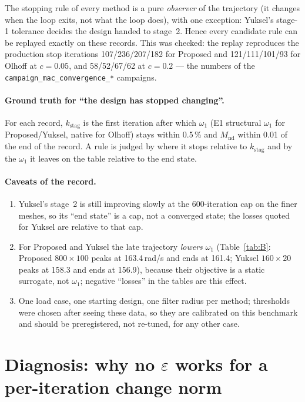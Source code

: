 \documentclass[11pt,a4paper]{article}
\newcommand{\Mnd}{M_{\mathrm{nd}}}
\newcommand{\kstag}{k_{\mathrm{stag}}}
\newcommand{\me}[2]{$#1\times#2$}
\newcommand{\file}[1]{\texttt{#1}}
\begin{document}
The stopping rule of every method is a pure \emph{observer} of the trajectory
(it changes when the loop exits, not what the loop does), with one exception:
Yuksel's stage-1 tolerance decides the design handed to stage~2. Hence every
candidate rule can be replayed exactly on these records. This was checked: the
replay reproduces the production stop iterations 107/236/207/182 for Proposed
and 121/111/101/93 for Olhoff at $c = 0.05$, and 58/52/67/62 at $c = 0.2$ --- the
numbers of the \file{campaign\_\allowbreak{}mac\_\allowbreak{}convergence\_\allowbreak{}*} campaigns.

\paragraph{Ground truth for ``the design has stopped changing''.}
For each record, $\kstag$ is the first iteration after which $\omega_1$ (E1
structural $\omega_1$ for Proposed/Yuksel, native for Olhoff) stays within
0.5\,\% and $\Mnd$ within 0.01 of the end of the record. A rule is judged by
where it stops relative to $\kstag$ and by the $\omega_1$ it leaves on the table
relative to the end state.

\paragraph{Caveats of the record.}
\begin{enumerate}[label=(\roman*)]
\item Yuksel's stage~2 is still improving slowly at the 600-iteration cap on
  the finer meshes, so its ``end state'' is a cap, not a converged state; the
  losses quoted for Yuksel are relative to that cap.
\item For Proposed and Yuksel the late trajectory \emph{lowers} $\omega_1$
  (Table~\ref{tab:B}: Proposed \me{800}{100} peaks at 163.4\,rad/s and ends at
  161.4; Yuksel \me{160}{20} peaks at 158.3 and ends at 156.9), because their
  objective is a static surrogate, not $\omega_1$; negative ``losses'' in the
  tables are this effect.
\item One load case, one starting design, one filter radius per method;
  thresholds were chosen after seeing these data, so they are calibrated on
  this benchmark and should be preregistered, not re-tuned, for any other case.
\end{enumerate}

\section{Diagnosis: why no \texorpdfstring{$\varepsilon$}{epsilon} works for a per-iteration change norm}
\end{document}
